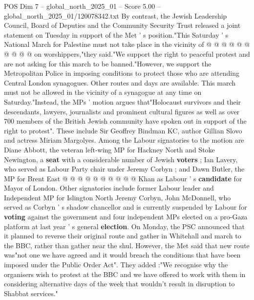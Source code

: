 \begin{textsample}{POS Dim 7 – global\_north\_2025\_01 – Score 5.00 – global\_north\_2025\_01/120078342.txt}
By contrast, the Jewish Leadership Council, Board of Deputies and the Community Security Trust released a joint statement on Tuesday in support of the Met ' s position."This Saturday ' s National March for Palestine must not take place in the vicinity of @ @ @ @ @ @ @ @ @ @ on worshippers,"they said."We support the right to peaceful protest and are not asking for this march to be banned."However, we support the Metropolitan Police in imposing conditions to protect those who are attending Central London synagogues.
Other routes and days are available.
This march must not be allowed in the vicinity of a synagogue at any time on Saturday."Instead, the MPs ' motion argues that"Holocaust survivors and their descendants, lawyers, journalists and prominent cultural figures as well as over 700 members of the British Jewish community have spoken out in support of the right to protest".
These include Sir Geoffrey Bindman KC, author Gillian Slovo and actress Miriam Margolyes.
Among the Labour signatories to the motion are Diane Abbott, the veteran left-wing MP for Hackney North and Stoke Newington, a \textbf{seat} with a considerable number of Jewish \textbf{voters} ; Ian Lavery, who served as Labour Party chair under Jeremy Corbyn ; and Dawn Butler, the MP for Brent East @ @ @ @ @ @ @ @ @ @ Khan as Labour ' s \textbf{candidate} for Mayor of London.
Other signatories include former Labour leader and Independent MP for Islington North Jeremy Corbyn, John McDonnell, who served as Corbyn ' s shadow chancellor and is currently suspended by Labour for \textbf{voting} against the government and four independent MPs elected on a pro-Gaza platform at last year ' s general \textbf{election}.
On Monday, the PSC announced that it planned to reverse their original route and gather in Whitehall and march to the BBC, rather than gather near the shul.
However, the Met said that new route was"not one we have agreed and it would breach the conditions that have been imposed under the Public Order Act".
They added :"We recognise why the organisers wish to protest at the BBC and we have offered to work with them in considering alternative days of the week that wouldn't result in disruption to Shabbat services."

\end{textsample}
